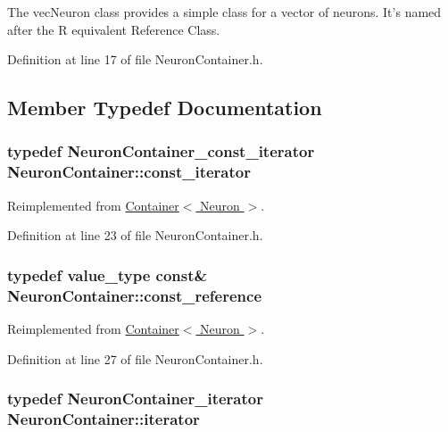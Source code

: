 The vecNeuron class provides a simple class for a vector of neurons. It's named after the R equivalent Reference Class. 

Definition at line 17 of file NeuronContainer.h.



\subsection{Member Typedef Documentation}
\hypertarget{class_neuron_container_a41749602f05e7610da7f0f1fd59f5442}{
\subsubsection[{const\_\-iterator}]{\setlength{\rightskip}{0pt plus 5cm}typedef NeuronContainer\_\-const\_\-iterator {\bf NeuronContainer::const\_\-iterator}}}
\label{class_neuron_container_a41749602f05e7610da7f0f1fd59f5442}


Reimplemented from \hyperlink{class_container_a5eabadaffdd508cb623c955eb0af1518}{Container$<$ Neuron $>$}.



Definition at line 23 of file NeuronContainer.h.

\hypertarget{class_neuron_container_a468ffbb00b15553f73da46dd62c91c8d}{
\subsubsection[{const\_\-reference}]{\setlength{\rightskip}{0pt plus 5cm}typedef {\bf value\_\-type} const\& {\bf NeuronContainer::const\_\-reference}}}
\label{class_neuron_container_a468ffbb00b15553f73da46dd62c91c8d}


Reimplemented from \hyperlink{class_container_a8dd7ae9d0687e11d873f98206e961ac1}{Container$<$ Neuron $>$}.



Definition at line 27 of file NeuronContainer.h.

\hypertarget{class_neuron_container_abf81356adaea3bfc64aa03777e9a8def}{
\subsubsection[{iterator}]{\setlength{\rightskip}{0pt plus 5cm}typedef NeuronContainer\_\-iterator {\bf NeuronContainer::iterator}}}
\label{class_neuron_container_abf81356adaea3bfc64aa03777e9a8def}


